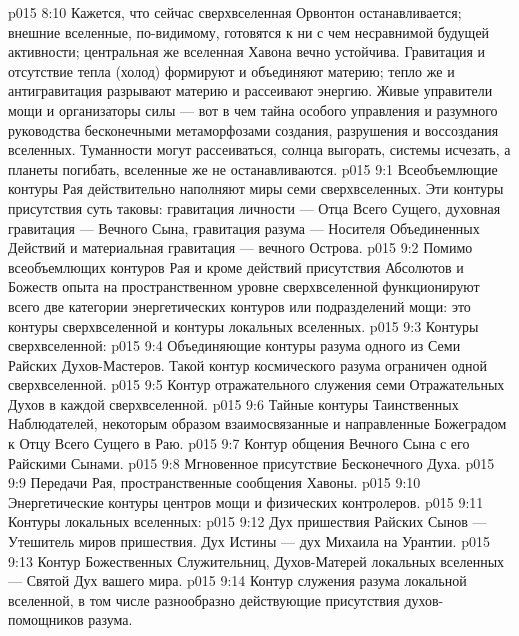 \vs p015 8:10 Кажется, что сейчас сверхвселенная Орвонтон останавливается; внешние вселенные, по\hyp{}видимому, готовятся к ни с чем несравнимой будущей активности; центральная же вселенная Хавона вечно устойчива. Гравитация и отсутствие тепла (холод) формируют и объединяют материю; тепло же и антигравитация разрывают материю и рассеивают энергию. Живые управители мощи и организаторы силы --- вот в чем тайна особого управления и разумного руководства бесконечными метаморфозами создания, разрушения и воссоздания вселенных. Туманности могут рассеиваться, солнца выгорать, системы исчезать, а планеты погибать, вселенные же не останавливаются.
\vs p015 9:1 Всеобъемлющие контуры Рая действительно наполняют миры семи сверхвселенных. Эти контуры присутствия суть таковы: гравитация личности --- Отца Всего Сущего, духовная гравитация --- Вечного Сына, гравитация разума --- Носителя Объединенных Действий и материальная гравитация --- вечного Острова.
\vs p015 9:2 Помимо всеобъемлющих контуров Рая и кроме действий присутствия Абсолютов и Божеств опыта на пространственном уровне сверхвселенной функционируют всего две категории энергетических контуров или подразделений мощи: это контуры сверхвселенной и контуры локальных вселенных.
\vs p015 9:3 \pc Контуры сверхвселенной:
\vs p015 9:4 \bibnobreakspace Объединяющие контуры разума одного из Семи Райских Духов\hyp{}Мастеров. Такой контур космического разума ограничен одной сверхвселенной.
\vs p015 9:5 \bibnobreakspace Контур отражательного служения семи Отражательных Духов в каждой сверхвселенной.
\vs p015 9:6 \bibnobreakspace Тайные контуры Таинственных Наблюдателей, некоторым образом взаимосвязанные и направленные Божеградом к Отцу Всего Сущего в Раю.
\vs p015 9:7 \bibnobreakspace Контур общения Вечного Сына с его Райскими Сынами.
\vs p015 9:8 \bibnobreakspace Мгновенное присутствие Бесконечного Духа.
\vs p015 9:9 \bibnobreakspace Передачи Рая, пространственные сообщения Хавоны.
\vs p015 9:10 \bibnobreakspace Энергетические контуры центров мощи и физических контролеров.
\vs p015 9:11 \pc Контуры локальных вселенных:
\vs p015 9:12 \bibnobreakspace Дух пришествия Райских Сынов --- Утешитель миров пришествия. Дух Истины --- дух Михаила на Урантии.
\vs p015 9:13 \bibnobreakspace Контур Божественных Служительниц, Духов\hyp{}Матерей локальных вселенных --- Святой Дух вашего мира.
\vs p015 9:14 \bibnobreakspace Контур служения разума локальной вселенной, в том числе разнообразно действующие присутствия духов\hyp{}помощников разума.
